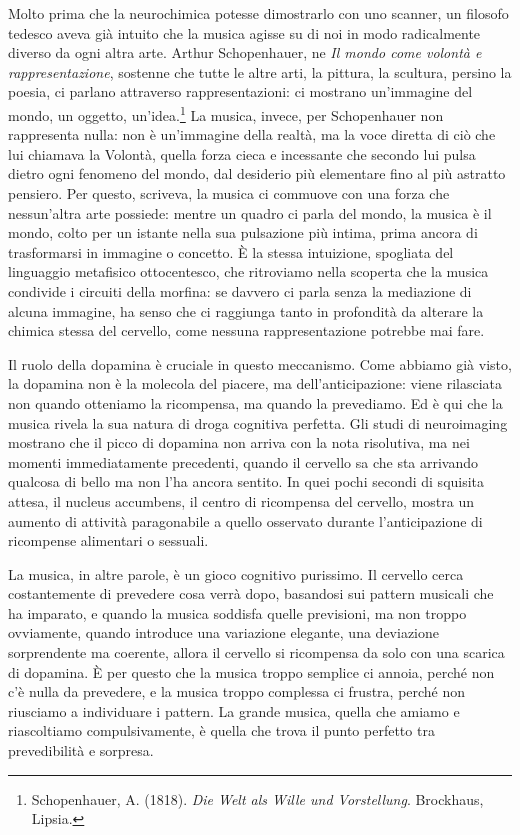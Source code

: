 Molto prima che la neurochimica potesse dimostrarlo con uno scanner, un filosofo tedesco aveva gi\`{a} intuito che la musica agisse su di noi in modo radicalmente diverso da ogni altra arte. Arthur Schopenhauer, ne \textit{Il mondo come volont\`{a} e rappresentazione}, sostenne che tutte le altre arti, la pittura, la scultura, persino la poesia, ci parlano attraverso rappresentazioni: ci mostrano un'immagine del mondo, un oggetto, un'idea.\footnote{Schopenhauer, A. (1818). \textit{Die Welt als Wille und Vorstellung}. Brockhaus, Lipsia.} La musica, invece, per Schopenhauer non rappresenta nulla: non \`{e} un'immagine della realt\`{a}, ma la voce diretta di ci\`{o} che lui chiamava la Volont\`{a}, quella forza cieca e incessante che secondo lui pulsa dietro ogni fenomeno del mondo, dal desiderio pi\`{u} elementare fino al pi\`{u} astratto pensiero. Per questo, scriveva, la musica ci commuove con una forza che nessun'altra arte possiede: mentre un quadro ci parla del mondo, la musica \`{e} il mondo, colto per un istante nella sua pulsazione pi\`{u} intima, prima ancora di trasformarsi in immagine o concetto. \`{E} la stessa intuizione, spogliata del linguaggio metafisico ottocentesco, che ritroviamo nella scoperta che la musica condivide i circuiti della morfina: se davvero ci parla senza la mediazione di alcuna immagine, ha senso che ci raggiunga tanto in profondit\`{a} da alterare la chimica stessa del cervello, come nessuna rappresentazione potrebbe mai fare.

Il ruolo della dopamina \`{e} cruciale in questo meccanismo. Come abbiamo gi\`{a} visto, la dopamina non \`{e} la molecola del piacere, ma dell'anticipazione: viene rilasciata non quando otteniamo la ricompensa, ma quando la prevediamo. Ed \`{e} qui che la musica rivela la sua natura di droga cognitiva perfetta. Gli studi di neuroimaging mostrano che il picco di dopamina non arriva con la nota risolutiva, ma nei momenti immediatamente precedenti, quando il cervello sa che sta arrivando qualcosa di bello ma non l'ha ancora sentito. In quei pochi secondi di squisita attesa, il nucleus accumbens, il centro di ricompensa del cervello, mostra un aumento di attivit\`{a} paragonabile a quello osservato durante l'anticipazione di ricompense alimentari o sessuali.

La musica, in altre parole, \`{e} un gioco cognitivo purissimo. Il cervello cerca costantemente di prevedere cosa verr\`{a} dopo, basandosi sui pattern musicali che ha imparato, e quando la musica soddisfa quelle previsioni, ma non troppo ovviamente, quando introduce una variazione elegante, una deviazione sorprendente ma coerente, allora il cervello si ricompensa da solo con una scarica di dopamina. \`{E} per questo che la musica troppo semplice ci annoia, perch\'{e} non c'\`{e} nulla da prevedere, e la musica troppo complessa ci frustra, perch\'{e} non riusciamo a individuare i pattern. La grande musica, quella che amiamo e riascoltiamo compulsivamente, \`{e} quella che trova il punto perfetto tra prevedibilit\`{a} e sorpresa.

